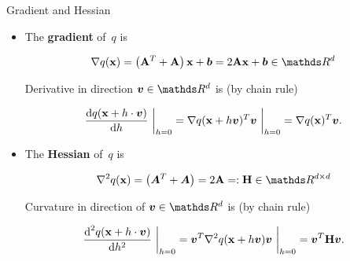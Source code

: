 \documentclass[11pt,compress,t,notes=noshow, xcolor=table]{beamer}
\begin{document}
\begin{vbframe}{Gradient and Hessian}
    
\begin{itemize}
    \item The \textbf{gradient} of~$q$ is
    
        \vspace{-0.5\baselineskip}
        
        \begin{equation*}
            \nabla q(\xv) = \left(\Amat^T + \Amat\right) \xv + \bm{b} = 2 \Amat \xv + \bm{b} \in \R^d
        \end{equation*}

        \vspace{-0.25\baselineskip}
    
        Derivative in direction $\bm{v}\in \R^d$ is (by chain rule)
    
        \begin{equation*}
            \frac{\text{d}q(\mathbf{x} + h \cdot \bm{v})}{\text{d}h}~\bigg\rvert_{h = 0} = \nabla q(\mathbf{x} + h \bm{v})^T \bm{v}~\bigg\rvert_{h = 0} = \nabla q(\mathbf{x})^T \bm{v}.
        \end{equation*}

    \vspace{0.5\baselineskip}

    \item The \textbf{Hessian} of~$q$ is
        
        \vspace{-0.5\baselineskip}
        
        \begin{equation*}
            \nabla^2 q(\xv) = \left(\bm{A}^T + \bm{A}\right) = 2 \Amat =: \mathbf{H} \in \R^{d \times d}
        \end{equation*}    
        
        Curvature in direction of $\bm{v}\in \R^d$ is (by chain rule)

        \vspace{-0.5\baselineskip}
        
        \begin{equation*}
            \frac{\text{d}^2 q(\mathbf{x} + h \cdot \bm{v})}{\text{d} h^2}~\bigg\rvert_{h = 0}
            = \bm{v}^T \nabla^2 q(\mathbf{x} + h \bm{v}) \bm{v}~\bigg\rvert_{h = 0} = \bm{v}^T \mathbf{H} \bm{v}.
        \end{equation*}
\end{itemize}

\end{vbframe}
\end{document}
